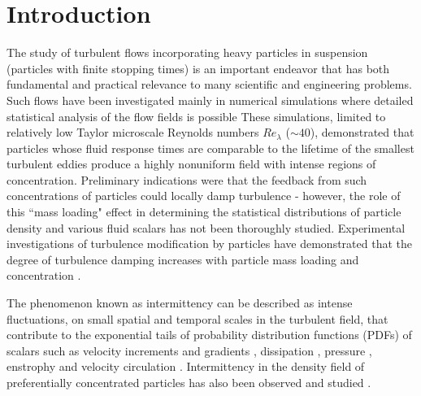 \documentclass[aps,pra,twocolumn,groupedaddress,showkeys,showpacs,floatfix]{revtex4}
\begin{document}
\section{Introduction}

The study of turbulent flows incorporating heavy particles in suspension (particles 
with finite stopping times) is an
important endeavor that has both fundamental and practical relevance to many
scientific and engineering problems. Such flows have been investigated mainly
in numerical simulations where detailed statistical analysis of the flow
fields is possible \cite{Squires:4,Squires:1,Squires:2,Kulick:1}   
These
simulations, limited to relatively low Taylor microscale Reynolds numbers
$Re_\lambda$ ($\sim 40$), demonstrated that particles whose fluid response
times are comparable to the lifetime of the smallest turbulent eddies produce a
highly nonuniform field with intense regions of concentration. Preliminary
indications were that the feedback from such concentrations of particles could
locally damp turbulence - however, the role of this ``mass loading" effect in
determining the statistical distributions of particle density and various fluid
scalars has not been thoroughly studied. Experimental investigations of
turbulence modification by particles have demonstrated that the degree of
turbulence  damping increases with particle mass loading and concentration 
\cite{Kulick:1}.

The phenomenon known as intermittency can be described as intense fluctuations,
on small spatial and temporal scales in the turbulent field, that contribute to
the exponential tails of probability distribution functions (PDFs) of scalars
such as velocity increments and gradients \cite{Castaing:1,Dinavahi:1,Kailasnath:1}, 
dissipation \cite{Vincent:1}, pressure \cite{Pumir:1,Lamballais:1}, enstrophy \cite{Jimenez:2,He:1} 
and velocity circulation \cite{Cao:1}. Intermittency in the
density field of preferentially concentrated particles has also been observed
and studied \cite{Hogan:1,Balkovsky:1}.
\end{document}
